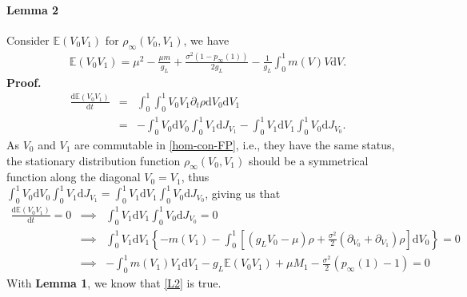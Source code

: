 \documentclass[10pt]{article}
\begin{document}
\begin{multicols}{2}
\paragraph{Lemma 2} Consider $\mathbb{E}(V_0V_1)$ for $\rho_{\infty}(V_0,V_1)$, we have 
\begin{eqnarray}
\label{L2}
\mathbb{E}(V_0V_1) = \mu^2-\frac{\mu m}{g_L}+\frac{\sigma^2(1-p_{\infty}(1))}{2g_L}-\frac{1}{g_L}\int_0^1{m(V)V\mbox{d}V}.
\end{eqnarray}
{\bf{Proof.}} 
\begin{eqnarray}
\frac{\mbox{d}\mathbb{E}(V_0V_1)}{\mbox{d}t} 
&=& \int_0^1{\int_0^1{V_0V_1\partial_t\rho\mbox{d}V_0}\mbox{d}V_1} \nonumber\\
&=& -\int_0^1{V_0\mbox{d}V_0\int_0^1{V_1\mbox{d}J_{V_1}}}-\int_0^1{V_1\mbox{d}V_1\int_0^1{V_0\mbox{d}J_{V_0}}}.
\end{eqnarray}
\indent
As $V_0$ and $V_1$ are commutable in \ref{hom-con-FP}, i.e., they have the same status, the stationary distribution function $\rho_{\infty}(V_0,V_1)$ should be a symmetrical function along the diagonal $V_0=V_1$, thus $\int_0^1{V_0\mbox{d}V_0\int_0^1{V_1\mbox{d}J_{V_1}}}=\int_0^1{V_1\mbox{d}V_1\int_0^1{V_0\mbox{d}J_{V_0}}}$, giving us that
\begin{eqnarray}
\frac{\mbox{d}\mathbb{E}(V_0V_1)}{\mbox{d}t}=0 
&\implies& \int_0^1{V_1\mbox{d}V_1\int_0^1{V_0\mbox{d}J_{V_0}}}=0 \nonumber\\
&\implies& \int_0^1{V_1\mbox{d}V_1 \left\{ -m(V_1) - \int_0^1{[(g_LV_0-\mu)\rho+\frac{\sigma^2}{2}(\partial_{V_0}+\partial_{V_1})\rho]\mbox{d}V_0}  \right\}}=0 \nonumber\\
&\implies& -\int_0^1{m(V_1)V_1\mbox{d}V_1}-g_L\mathbb{E}(V_0V_1)+\mu M_1-\frac{\sigma^2}{2}(p_{\infty}(1)-1)=0
\end{eqnarray}
With {\bf{Lemma 1}}, we know that \ref{L2} is true.


\end{multicols}
\end{document}
